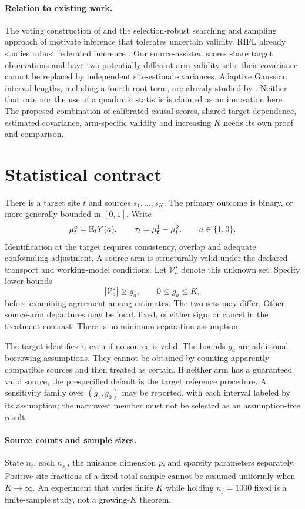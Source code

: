 \paragraph{Relation to existing work.}
The voting construction of \citet{guo2018} and the selection-robust searching
and sampling approach of \citet{guo2023} motivate inference that tolerates
uncertain validity. RIFL already studies robust federated inference
\citep{rifl2025}. Our source-assisted scores share target observations and have
two potentially different arm-validity sets; their covariance cannot be
replaced by independent site-estimate variances. Adaptive Gaussian interval
lengths, including a fourth-root term, are already studied by
\citet{wang2026}. Neither that rate nor the use of a quadratic statistic is
claimed as an innovation here. The proposed combination of calibrated causal
scores, shared-target dependence, estimated covariance, arm-specific validity
and increasing $K$ needs its own proof and comparison.

\section{Statistical contract}

There is a target site $t$ and sources $s_1,\ldots,s_K$. The primary outcome
is binary, or more generally bounded in $[0,1]$. Write
\[
 \mu_t^a=\mathbb E_t Y(a),\qquad \tau_t=\mu_t^1-\mu_t^0,
 \qquad a\in\{1,0\}.
\]
Identification at the target requires consistency, overlap and adequate
confounding adjustment. A source arm is structurally valid under the declared
transport and working-model conditions. Let $\mathcal V_a^\star$ denote this
unknown set. Specify lower bounds
\[
 |\mathcal V_a^\star|\ge g_a,\qquad 0\le g_a\le K,
\]
before examining agreement among estimates. The two sets may differ. Other
source-arm departures may be local, fixed, of either sign, or cancel in the
treatment contrast. There is no minimum separation assumption.

The target identifies $\tau_t$ even if no source is valid. The bounds $g_a$
are additional borrowing assumptions. They cannot be obtained by counting
apparently compatible sources and then treated as certain. If neither arm has
a guaranteed valid source, the prespecified default is the target reference
procedure. A sensitivity family over $(g_1,g_0)$ may be reported, with each
interval labeled by its assumption; the narrowest member must not be selected
as an assumption-free result.

\paragraph{Source counts and sample sizes.}
State $n_t$, each $n_{s_j}$, the nuisance dimension $p$, and sparsity parameters
separately. Positive site fractions of a fixed total sample cannot be assumed
uniformly when $K\to\infty$. An experiment that varies finite $K$ while holding
$n_j=1000$ fixed is a finite-sample study, not a growing-$K$ theorem.

